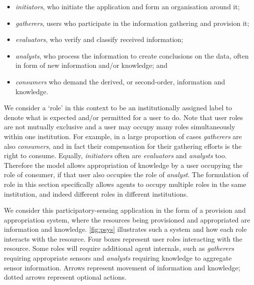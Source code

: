 \begin{itemize}
\item \emph{initiators}, who initiate the application and form an organisation around it;
\item  \emph{gatherers}, users who participate in the information gathering and provision it; 
\item \emph{evaluators}, who verify and classify received information; 
\item \emph{analysts}, who process the information to create conclusions on the data, often in form of new information and/or knowledge; and
\item \emph{consumers} who demand the derived, or second-order, information and knowledge. 
\end{itemize}
We consider a `role' in this context to be an institutionally assigned label to denote what is expected and/or permitted for a user to do. 
Note that user roles are not mutually exclusive and a user may occupy many roles simultaneously within one institution. For example,
in a large proportion of cases \emph{gatherers} are also \emph{consumers}, and in fact their compensation for their gathering efforts is the right to consume. Equally, \emph{initiators} often are \emph{evaluators} and \emph{analysts} too. Therefore the model allows
appropriation of knowledge by a user occupying the role of consumer, if that user also occupies the role of \emph{analyst}. The
formulation of role in this section specifically allows agents to occupy multiple roles in the same institution, and indeed different
roles in different institutions.

We consider this participatory-sensing application in the form of a provision and appropriation system, where the resources being provisioned and appropriated are information and knowledge. \autoref{fig:psys} illustrates such a system and how each role interacts with the resource. Four boxes represent user roles interacting with the resource. Some roles will require additional agent internals, such as \emph{gatherers} requiring appropriate sensors and \emph{analysts} requiring knowledge to aggregate sensor information. Arrows represent movement of information and knowledge; dotted arrows represent optional actions.

